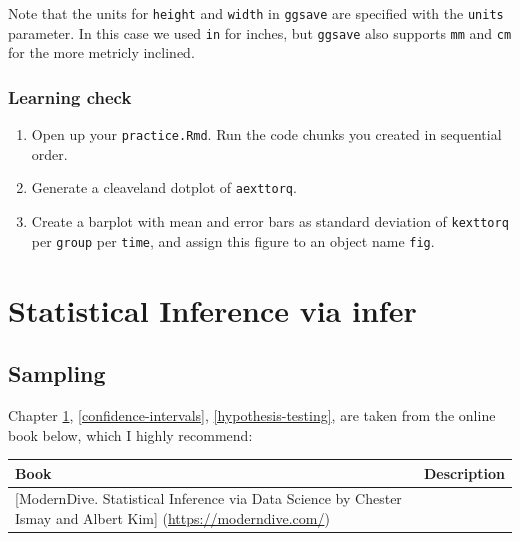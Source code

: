 \documentclass[
]{book}
\begin{document}
Note that the units for \texttt{height} and \texttt{width} in \texttt{ggsave} are specified with the \texttt{units} parameter. In this case we used \texttt{in} for inches, but \texttt{ggsave} also supports \texttt{mm} and \texttt{cm} for the more metricly inclined.

\hypertarget{learning-check}{%
\section*{Learning check}\label{learning-check}}

\begin{enumerate}
\def\labelenumi{\arabic{enumi}.}
\item
  Open up your \texttt{practice.Rmd}. Run the code chunks you created in sequential order.
\item
  Generate a cleaveland dotplot of \texttt{aexttorq}.
\item
  Create a barplot with mean and error bars as standard deviation of \texttt{kexttorq} per \texttt{group} per \texttt{time}, and assign this figure to an object name \texttt{fig}.
\end{enumerate}

\hypertarget{part-statistical-inference-via-infer}{%
\part{Statistical Inference via infer}\label{part-statistical-inference-via-infer}}

\hypertarget{sampling}{%
\chapter{Sampling}\label{sampling}}

Chapter \ref{sampling}, \ref{confidence-intervals}, \ref{hypothesis-testing}, are taken from the online book below, which I highly recommend:

\begin{longtable}[]{@{}ll@{}}
\toprule
\begin{minipage}[b]{0.42\columnwidth}\raggedright
Book\strut
\end{minipage} & \begin{minipage}[b]{0.52\columnwidth}\raggedright
Description\strut
\end{minipage}\tabularnewline
\midrule
\endhead
\begin{minipage}[t]{0.42\columnwidth}\raggedright
{[}ModernDive. Statistical Inference via Data Science by Chester Ismay and Albert Kim{]} (\url{https://moderndive.com/})\strut
\end{minipage} & \begin{minipage}[t]{0.52\columnwidth}\raggedright
\strut
\end{minipage}\tabularnewline
\bottomrule
\end{longtable}
\end{document}
